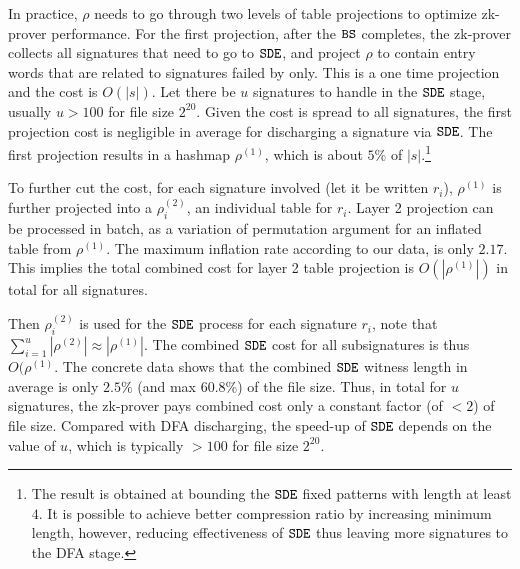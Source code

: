 In practice, $\rho$ needs to go through two levels
of table projections to optimize zk-prover performance.
For the first projection, after the $\texttt{BS}$ completes,
the zk-prover collects all signatures that need to go to
$\texttt{SDE}$, and project $\rho$ to contain entry words that
are related to signatures failed by \bw only.  
This is a one time projection and the cost is
$O(|s|)$. 
Let there be $u$ signatures to handle in the
$\texttt{SDE}$ stage, usually $u>100$ for file size $2^{20}$.
Given the cost is spread to all signatures, the first
projection cost is negligible in average for discharging a signature
via $\texttt{SDE}$.
The first projection results in a hashmap
$\rho^{(1)}$,
which is about $5\%$ of $|s|$.\footnote{The result is obtained 
at bounding the $\texttt{SDE}$ fixed patterns with length at least $4$.
It is possible to achieve better compression ratio by increasing
minimum length, however, reducing effectiveness of $\texttt{SDE}$ thus
leaving more signatures to the DFA stage.}

To further cut the cost, for each signature involved (let it be written $r_i$),
$\rho^{(1)}$ is further projected into a $\rho^{(2)}_i$,
an individual table for $r_i$.  
Layer 2 projection can be processed in batch, as a
variation of permutation argument for an inflated table from $\rho^{(1)}$.
The maximum inflation rate according to our data,
is only $2.17$. This implies the total combined cost for
layer 2 table projection is  $O(|\rho^{(1)}|)$ in total for all signatures. 

Then $\rho^{(2)}_i$ is used for the
$\texttt{SDE}$ process for each signature $r_i$, note that
$\sum_{i=1}^u |\rho^{(2)}| \approx |\rho^{(1)}|$. 
The combined $\texttt{SDE}$ cost for all subsignatures is thus $O(\rho^{(1)}$.
The concrete data shows that the combined $\texttt{SDE}$ witness length
in average is only $2.5\%$ (and max $60.8\%$)
of the file size.
Thus, in total for $u$ signatures, the zk-prover pays
combined cost only a constant factor (of $<2$) of file size.
Compared with DFA discharging, the speed-up of $\texttt{SDE}$
depends on the value of $u$, which is typically $>100$ for file size $2^{20}$.


